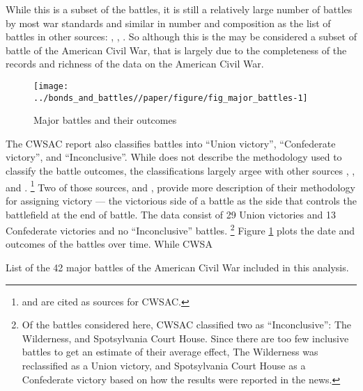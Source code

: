 While this is a subset of the battles, it is still a relatively large number of battles by most war standards and similar in number and composition as the list of battles in other sources: \textcite{Livermore1900}, \textcite{Bodart1908}, \textcite{cdb90}.
So although this is the may be considered a subset of battle of the American Civil War, that is largely due to the completeness of the records and richness of the data on the American Civil War.

\begin{figure}[htpb]
  \centering
  \texttt{[image: ../bonds\_and\_battles//paper/figure/fig\_major\_battles-1]}
  \caption{Major battles and their outcomes}
  \label{bonds_battles:fig:major_battles}
\end{figure}

The CWSAC report \parencite{CWSAC1993b} also classifies battles into ``Union victory'', ``Confederate victory'', and ``Inconclusive''.
While \textcite{CWSAC1993} does not describe the methodology used to classify the battle outcomes, the classifications largely argee with other sources \textcite{fox1898regimental}, \textcite{Livermore1900}, \textcite{Bodart1908} and \textcite{cdb90}.%
\footnote{\textcite{fox1898regimental} and \textcite{Livermore1900} are cited as sources for CWSAC.}
Two of those sources, \textcite{fox1898regimental} and \textcite{Livermore1900}, provide more description of their methodology for assigning victory --- the victorious side of a battle as the side that controls the battlefield at the end of battle.
The data consist of 29 Union victories and 13 Confederate victories and no ``Inconclusive'' battles.%
\footnote{
  Of the battles considered here, CWSAC classified two as ``Inconclusive'': The Wilderness, and Spotsylvania Court House.
  Since there are too few inclusive battles to get an estimate of their average effect, The Wilderness was reclassified as a Union victory, and Spotsylvania Court House as a Confederate victory based on how the results were reported in the news.
}
Figure \ref{bonds_battles:fig:major_battles} plots the date and outcomes of the  battles over time.
While CWSA

\begin{table}
  \centering
  
  \caption{List of the 42 major battles of the American Civil War included in this analysis.}
  \label{bonds_battles:tab:battles}
\end{table}

